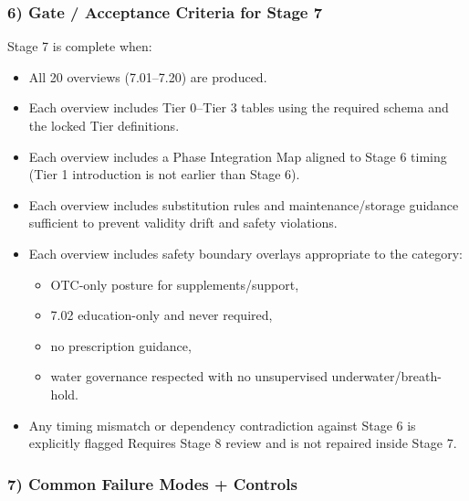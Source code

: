 \documentclass[10pt]{article}
\begin{document}
\subsubsection*{6) Gate / Acceptance Criteria for Stage 7}

Stage 7 is complete when:

\begin{itemize}
\item All 20 overviews (7.01–7.20) are produced.
\item Each overview includes Tier 0–Tier 3 tables using the required schema and the locked Tier definitions.
\item Each overview includes a Phase Integration Map aligned to Stage 6 timing (Tier 1 introduction is not earlier than Stage 6).
\item Each overview includes substitution rules and maintenance/storage guidance sufficient to prevent validity drift and safety violations.
\item Each overview includes safety boundary overlays appropriate to the category:
  \begin{itemize}
  \item OTC-only posture for supplements/support,
  \item 7.02 education-only and never required,
  \item no prescription guidance,
  \item water governance respected with no unsupervised underwater/breath-hold.
  \end{itemize}
\item Any timing mismatch or dependency contradiction against Stage 6 is explicitly flagged Requires Stage 8 review and is not repaired inside Stage 7.
\end{itemize}

\subsubsection*{7) Common Failure Modes + Controls}
\end{document}
